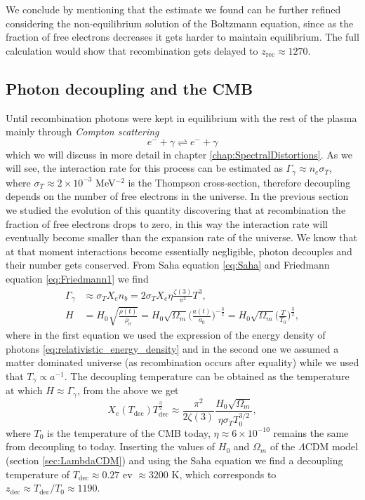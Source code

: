 We conclude by mentioning that the estimate we found can be further refined considering the non-equilibrium solution of the Boltzmann equation, since as the fraction of free electrons decreases it gets harder to maintain equilibrium. The full calculation would show that recombination gets delayed to $z_\text{rec}\approx 1270$.
\subsection{Photon decoupling and the CMB}
Until recombination photons were kept in equilibrium with the rest of the plasma mainly through \emph{Compton scattering}
$$
e^-+\gamma\rightleftharpoons e^-+\gamma 
$$
which we will discuss in more detail in chapter \ref{chap:SpectralDistortions}. As we will see, the interaction rate for this process can be estimated as $\Gamma_\gamma\approx n_e\sigma_T$, where $\sigma_T\approx2\times 10^{-3}$ MeV$^{-2}$ is the Thompson cross-section, therefore decoupling depends on the number of free electrons in the universe. In the previous section we studied the evolution of this quantity discovering that at recombination the fraction of free electrons drops to zero, in this way the interaction rate will eventually become smaller than the expansion rate of the universe. We know that at that moment interactions become essentially negligible, photon decouples and their number gets conserved. From Saha equation \eqref{eq:Saha} and Friedmann equation \eqref{eq:Friedmann1} we find
\begin{align*}
    \Gamma_\gamma&\approx \sigma_T X_e n_b=2\sigma_T X_e\eta\frac{\zeta(3)}{\pi^2}T^3,\\
    H&=H_0\sqrt{\frac{\rho(t)}{\rho_0}}=H_0\sqrt{\Omega_m}\bigg(\frac{a(t)}{a_0}\bigg)^{-\frac{3}{2}}=H_0\sqrt{\Omega_m}\bigg(\frac{T}{T_0}\bigg)^{\frac{3}{2}},
\end{align*}
where in the first equation we used the expression of the energy density of photons \eqref{eq:relativistic_energy_density} and in the second one we assumed a matter dominated universe (as recombination occurs after equality) while we used that $T_\gamma\propto a^{-1}$. The decoupling temperature can be obtained as the temperature at which $H\approx\Gamma_\gamma$, from the above we get
$$
X_e(T_\text{dec})T_\text{dec}^{\frac{3}{2}}\approx\frac{\pi^2}{2\zeta(3)}\frac{H_0\sqrt{\Omega_m}}{\eta\sigma_T T_0^{3/2}},
$$
where $T_0$ is the temperature of the CMB today, $\eta\approx6\times10^{-10}$ remains the same from decoupling to today. Inserting the values of $H_0$ and $\Omega_m$ of the $\Lambda$CDM model (section \ref{sec:LambdaCDM}) and using the Saha equation we find a decoupling temperature of $T_\text{dec}\approx 0.27$ ev $\approx3200$ K, which corresponds to $z_\text{dec}\approx T_\text{dec}/T_0\approx 1190$. 

